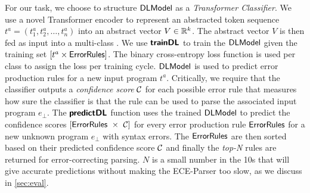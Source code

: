 

%

%
For our task, we choose to structure $\mathsf{DLModel}$ as a \emph{Transformer
Classifier}. We use a novel Transformer encoder to represent an abstracted token
sequence $t^a = (t^a_1, t^a_2, \dots, t^a_n)$ into an abstract vector $V \in
\mathbb{R}^k$. The abstract vector $V$ is then fed as input into a multi-class \dnn. We
use $\bm{\mathsf{trainDL}}$ to train the $\mathsf{DLModel}$ given the training set $[t^a \times
\mathsf{ErrorRules}]$. The binary cross-entropy loss function is used per class to
assign the loss per training cycle. $\mathsf{DLModel}$ is used to predict error production
rules for a new input program $t^a$. Critically, we require that the classifier
outputs a \emph{confidence score} $\mathcal{C}$ for each possible error rule that
measures how sure the classifier is that the rule can be used to parse the
associated input program $e_{\bot}$. The $\bm{\mathsf{predictDL}}$ function uses the
trained $\mathsf{DLModel}$ to predict the confidence scores $\List{\errorrulessym\ \times\
\Conf}$ for every error production rule $\mathsf{ErrorRules}$ for a new unknown
program $e_\bot$ with syntax errors. The $\mathsf{ErrorRules}$ are then sorted based
on their predicted confidence score $\mathcal{C}$ and finally the \emph{top-N} rules
are returned for error-correcting parsing. $N$ is a small number in the 10s that
will give accurate predictions without making the ECE-Parser too slow, as we
discuss in \autoref{sec:eval}.
